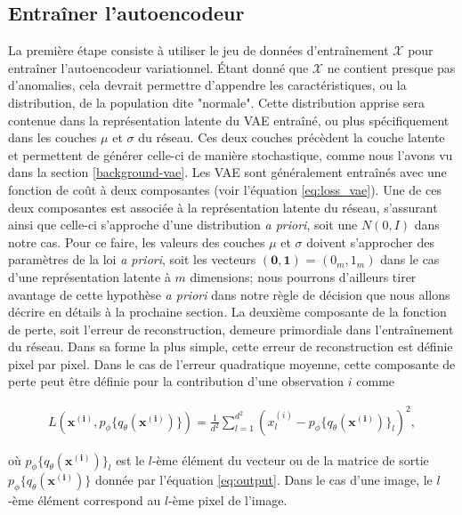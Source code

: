 \subsection{Entraîner l'autoencodeur} \label{meth:train-vae}

La première étape consiste à utiliser le jeu de données d'entraînement $\mathcal{X}$ pour entraîner l'autoencodeur variationnel. Étant donné que $\mathcal{X}$ ne contient presque pas d'anomalies, cela devrait permettre d'appendre les caractéristiques, ou la distribution, de la population dite "normale". Cette distribution apprise sera contenue dans la représentation latente du VAE entraîné, ou plus spécifiquement dans les couches $\mu$ et $\sigma$ du réseau. Ces deux couches précèdent la couche latente et permettent de générer celle-ci de manière stochastique, comme nous l'avons vu dans la section \ref{background-vae}. Les VAE sont généralement entraînés avec une fonction de coût à deux composantes (voir l'équation \ref{eq:loss_vae}). Une de ces deux composantes est associée à la représentation latente du réseau, s'assurant ainsi que celle-ci s'approche d'une distribution \textit{a priori}, soit une $N(0, I)$ dans notre cas. Pour ce faire, les valeurs des couches $\mu$ et $\sigma$ doivent s'approcher des paramètres de la loi \textit{a priori}, soit les vecteurs $(\mathbf{0}, \mathbf{1})$ = $(0_m, 1_m)$ dans le cas d'une représentation latente à $m$ dimensions; nous pourrons d'ailleurs tirer avantage de cette hypothèse \textit{a priori} dans notre règle de décision que nous allons décrire en détails à la prochaine section. La deuxième composante de la fonction de perte, soit l'erreur de reconstruction, demeure primordiale dans l'entraînement du réseau. Dans sa forme la plus simple, cette erreur de reconstruction est définie pixel par pixel. Dans le cas de l'erreur quadratique moyenne, cette composante de perte peut être définie pour la contribution d'une observation $i$ comme

\begin{gather} \label{eq:mse_loss}
L(\boldsymbol{x^{(i)}}, p_\phi\{q_\theta(\boldsymbol{x^{(i)}})\}) = \frac{1}{d^2} \sum_{l=1}^{d^2} (x^{(i)}_{l} - p_\phi\{q_\theta(\boldsymbol{x^{(i)}})\}_l)^2,
\end{gather}

où $p_\phi\{q_\theta(\boldsymbol{x^{(i)}})\}_l$ est le $l$-ème élément du vecteur ou de la matrice de sortie $p_\phi\{q_\theta(\boldsymbol{x^{(i)}})\}$ donnée par l'équation \ref{eq:output}. Dans le cas d'une image, le $l$-ème élément correspond au $l$-ème  pixel de l'image.

